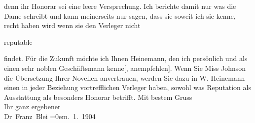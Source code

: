 \begin{ledgroupsized}[t]{13cm}
                    denn ihr Honorar sei eine leere Versprechung. Ich berichte damit nur was die Dame schreibt und kann
                    meinerseits nur sagen, dass sie soweit ich sie kenne, recht haben wird wenn sie
                    den Verleger nicht
                        \begin{otherlanguage}{english}reputable\end{otherlanguage} findet. Für die Zukunft möchte
                    ich Ihnen Heinemann, den ich persönlich und als
                    einen sehr noblen Geschäftsmann {\pb}kenne{[}, anempfehlen{]}. Wenn Sie Miss Johnson die Übersetzung Ihrer Novellen anvertrauen,
                    werden Sie dazu in W. Heinemann einen in
                    jeder Beziehung vortrefflichen Verleger haben, sowohl was Reputation als
                    Ausstattung als besonders Honorar betrifft.\pend
           \pstart
           Mit bestem Gruss{\\[\baselineskip]}Ihr ganz ergebener{\\[\baselineskip]}\spacefill\mbox{Dr Franz Blei}\pend
           \leftskip=0em{}. 1. 1904\pend
           \endnumbering{}\end{ledgroupsized}  \newcommand{\dateiname}{L01356}\newcommand{\titel}{Franz Blei an Arthur Schnitzler, 4. 1. 1904}\newcommand{\editorInnen}{Martin Anton Müller und Gerd-Hermann Susen}
      